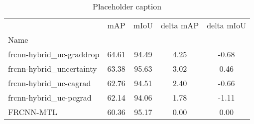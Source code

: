 \begin{table}[htbp]
\centering
\caption{Placeholder caption}
\label{tab:uc-grad}
\begin{tabular}{lcccc}
\toprule
 & mAP & mIoU & delta mAP & delta mIoU \\
Name &  &  &  &  \\
\midrule
frcnn-hybrid_uc-graddrop & 64.61 & 94.49 & 4.25 & -0.68 \\
frcnn-hybrid_uncertainty & 63.38 & 95.63 & 3.02 & 0.46 \\
frcnn-hybrid_uc-cagrad & 62.76 & 94.51 & 2.40 & -0.66 \\
frcnn-hybrid_uc-pcgrad & 62.14 & 94.06 & 1.78 & -1.11 \\
FRCNN-MTL & 60.36 & 95.17 & 0.00 & 0.00 \\
\bottomrule
\end{tabular}
\end{table}
